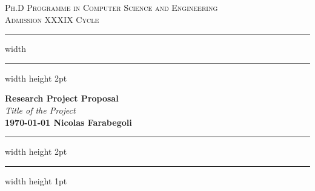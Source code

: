 \documentclass[12pt]{article}
\newcommand{\meta}[1]{{\color{blue}#1}}
\begin{document}
\begin{titlepage}
	\centering

	\textsc{\Large Ph.D Programme in Computer Science and Engineering}\\[0.5cm]
	\textsc{\Large Admission XXXIX Cycle}\\[0.6cm]

	\hrule width \hsize \kern 1mm \hrule width \hsize height 2pt
	\vspace{0.8cm}

	{\large \bfseries Research Project Proposal}\\[0.6cm]
	{\large \emph{Title of the Project}}\\[0.6cm]

	{\bfseries{\monthyeardate\today} \hfill \bfseries{Nicolas Farabegoli}}\\[0.6cm]

	\hrule width \hsize height 2pt \kern 1mm \hrule width \hsize height 1pt
	\vspace{0.4cm}

	\begin{abstract}
		In recent years,
		the emergence of \ac{cps} has engendered a noteworthy surge in complexity and heterogeneity
		within the underlying infrastructure supporting these systems.
		Notably, the interplay between cloud, fog, and edge computing exemplifies the intricacy inherent in such systems.
		Modern collective adaptive applications like \ac{iot}, swarm robotics, and smart cities,
		are designed to be executed on several devices and to be deployed in
		heterogeneous infrastructures, ranging from cloud servers to wearable devices.
		The availability of such a wide range of devices and infrastructures opens from one side
		better exploitation of the available resources and performance,
		but on the other side,
		it introduces complexity in the design and deployment of such applications.
		\meta{
		This research project proposes to produce a framework for the design and deployment of
		collective adaptive applications on heterogeneous infrastructures,
		where the \ac{ac} can be injected into.
		Reconfiguration aspects will be considered,
		allowing the application to adapt to the changes in the infrastructure and external conditions.
		The framework can leverage machine learning techniques to manage the complex task of reconfiguration
		to opportunistically balance the performance and energy consumption.
		Since the \ac{iot} consists of a large number of devices,
		they produce a large amount of data from extremely scattered data sources.
		The management of such data is a complex and delicate task,
		which will be addressed with state-of-the-art techniques.
		}
	\end{abstract}
\end{titlepage}
\end{document}
